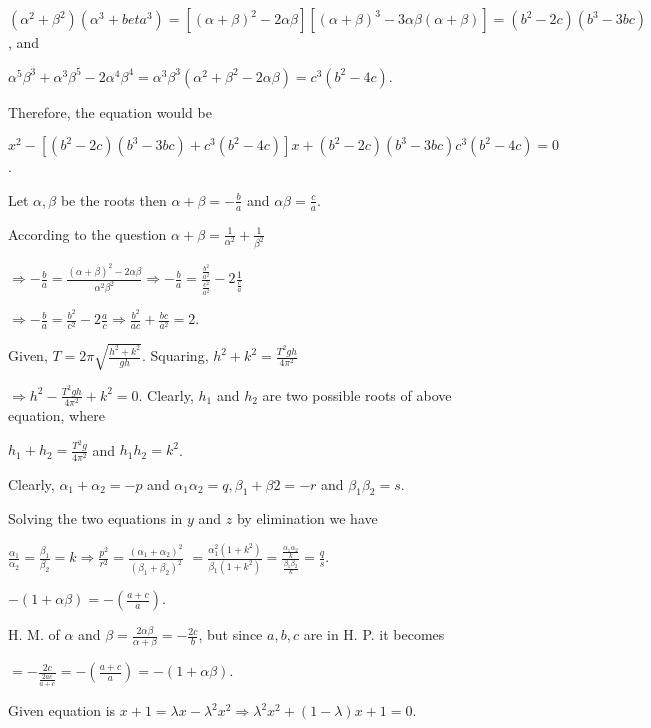   $(\alpha^2 + \beta^2)(\alpha^3 + beta^3) = [(\alpha + \beta)^2 - 2\alpha\beta][(\alpha + \beta)^3 -
  3\alpha\beta(\alpha + \beta)] = (b^2 - 2c)(b^3 - 3bc)$, and

  $\alpha^5\beta^3 + \alpha^3\beta^5 - 2\alpha^4\beta^4 = \alpha^3\beta^3(\alpha^2 + \beta^2 - 2\alpha\beta)
  = c^3(b^2 - 4c)$.

  Therefore, the equation would be

  $x^2 - [(b^2 - 2c)(b^3 - 3bc) + c^3(b^2 - 4c)]x + (b^2 - 2c)(b^3 - 3bc)c^3(b^2 - 4c) = 0$.
\item Let $\alpha, \beta$ be the roots then $\alpha + \beta = -\frac{b}{a}$ and $\alpha\beta = \frac{c}{a}$.

  According to the question $\alpha + \beta = \frac{1}{\alpha^2} + \frac{1}{\beta^2}$

  $\Rightarrow -\frac{b}{a} = \frac{(\alpha + \beta)^2 - 2\alpha\beta}{\alpha^2\beta^2}\Rightarrow
  -\frac{b}{a} = \frac{\frac{b^2}{a^2}}{\frac{c^2}{a^2}} - 2\frac{1}{\frac{c}{a}}$

  $\Rightarrow -\frac{b}{a} = \frac{b^2}{c^2} - 2\frac{a}{c}\Rightarrow \frac{b^2}{ac} + \frac{bc}{a^2} =
  2$.
\item Given, $T = 2\pi \sqrt{\frac{h^2 + k^2}{gh}}$. Squaring, $h^2 + k^2 = \frac{T^2gh}{4\pi^2}$

  $\Rightarrow h^2 - \frac{T^2gh}{4\pi^2} + k^2 = 0$. Clearly, $h_1$ and $h_2$ are two possible roots of
  above equation, where

  $h_1 + h_2 = \frac{T^2g}{4\pi^2}$ and $h_1h_2 = k^2$.
\item Clearly, $\alpha_1 + \alpha_2 = -p$ and $\alpha_1\alpha_2 = q, \beta_1 + \beta2 = -r$ and
  $\beta_1\beta_2 = s$.

  Solving the two equations in $y$ and $z$ by elimination we have

  $\frac{\alpha_1}{\alpha_2} = \frac{\beta_1}{\beta_2} = k\Rightarrow \frac{p^2}{r^2} = \frac{(\alpha_1 +
    \alpha_2)^2}{(\beta_1 + \beta_2)^2}$
  $= \frac{\alpha_1^2(1 + k^2)}{\beta_1(1 + k^2)} =
  \frac{\frac{\alpha_1\alpha_2}{k}}{\frac{\beta_1\beta_2}{k}} = \frac{q}{s}$.
\item $-(1 + \alpha\beta) = -(\frac{a + c}{a})$.

  H. M. of $\alpha$ and $\beta = \frac{2\alpha\beta}{\alpha + \beta} = -\frac{2c}{b}$, but since $a, b, c$
  are in H. P. it becomes

  $= -\frac{2c}{\frac{2ac}{a + c}} = -(\frac{a + c}{a}) = -(1 + \alpha\beta)$.
\item Given equation is $x + 1 = \lambda x - \lambda^2x^2\Rightarrow \lambda^2x^2 + (1 - \lambda)x + 1 = 0$.

